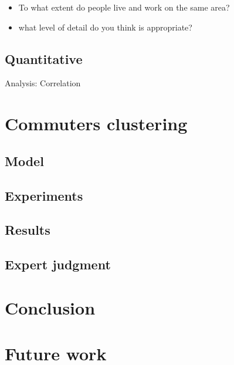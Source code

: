 \documentclass{article}
\begin{document}
\begin{itemize}
\item To what extent do people live and work on the same area?
\item what level of detail do you think is appropriate?
\end{itemize}

\subsection{Quantitative}
Analysis: Correlation


\newpage
\section{Commuters clustering}
\subsection{Model}

\subsection{Experiments}

\subsection{Results}

\subsection{Expert judgment}


\newpage
\section{Conclusion}


\newpage
\section{Future work}

\newpage
{}

\end{document}
